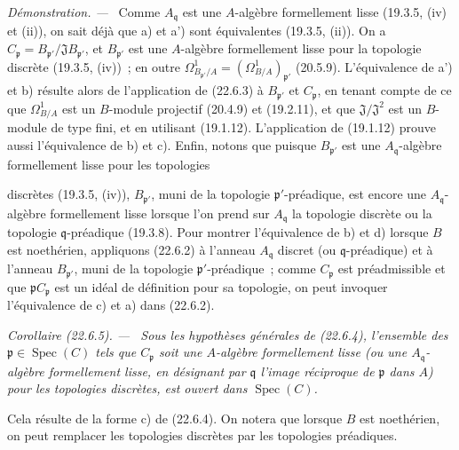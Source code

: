 \documentclass[10pt,oneside]{book}
\makeatletter
\newcommand{\setmanualcurrentlabel}[1]{\def\@currentlabel{#1}}
\newcommand{\oldpage}[2][]{%
  \setcounter{footnote}{0}%
  \marginpar{\scriptsize\textbf{#1}~|~#2}\ignorespaces}
\newenvironment{corollary}[1][]{%
  \setmanualcurrentlabel{#1}\par\medskip\noindent\itshape Corollaire (#1). ---\ }{\par}
\newenvironment{proof}{%
  \par\medskip\noindent\textit{Démonstration. ---\ }}{\par}
\makeatother
\begin{document}
\begin{proof}
Comme $A_{\mathfrak q}$ est une $A$-algèbre formellement lisse (19.3.5, (iv)
et (ii)), on sait déjà que a) et a') sont équivalentes (19.3.5, (ii)). On a
$C_{\mathfrak p}=B_{\mathfrak p'}/\mathfrak J B_{\mathfrak p'}$, et
$B_{\mathfrak p'}$ est une $A$-algèbre formellement lisse pour la topologie
discrète (19.3.5, (iv))~; en outre
$\Omega^1_{B_{\mathfrak p'}/A}=(\Omega^1_{B/A})_{\mathfrak p'}$ (20.5.9).
L'équivalence de a') et b) résulte alors de l'application de (22.6.3) à
$B_{\mathfrak p'}$ et $C_{\mathfrak p}$, en tenant compte de ce que
$\Omega^1_{B/A}$ est un $B$-module projectif (20.4.9) et (19.2.11), et que
$\mathfrak J/\mathfrak J^2$ est un $B$-module de type fini, et en utilisant
(19.1.12). L'application de (19.1.12) prouve aussi l'équivalence de b) et c).
Enfin, notons que puisque $B_{\mathfrak p'}$ est une
$A_{\mathfrak q}$-algèbre formellement lisse pour les topologies

\oldpage[0\textsubscript{IV-1}]{207}

discrètes (19.3.5, (iv)), $B_{\mathfrak p'}$, muni de la topologie
$\mathfrak p'$-préadique, est encore une $A_{\mathfrak q}$-algèbre
formellement lisse lorsque l'on prend sur $A_{\mathfrak q}$ la topologie
discrète ou la topologie $\mathfrak q$-préadique (19.3.8). Pour montrer
l'équivalence de b) et d) lorsque $B$ est noethérien, appliquons (22.6.2) à
l'anneau $A_{\mathfrak q}$ discret (ou $\mathfrak q$-préadique) et à l'anneau
$B_{\mathfrak p'}$, muni de la topologie $\mathfrak p'$-préadique~; comme
$C_{\mathfrak p}$ est préadmissible et que $\mathfrak pC_{\mathfrak p}$ est
un idéal de définition pour sa topologie, on peut invoquer l'équivalence de
c) et a) dans (22.6.2).
\end{proof}

\begin{corollary}[22.6.5]
\label{0.22.6.5-fr}
Sous les hypothèses générales de (22.6.4), l'ensemble des
$\mathfrak p\in\operatorname{Spec}(C)$ tels que $C_{\mathfrak p}$ soit une $A$-algèbre
formellement lisse (ou une $A_{\mathfrak q}$-algèbre formellement lisse, en
désignant par $\mathfrak q$ l'image réciproque de $\mathfrak p$ dans $A$)
pour les topologies discrètes, est ouvert dans $\operatorname{Spec}(C)$.
\end{corollary}

Cela résulte de la forme c) de (22.6.4). On notera que lorsque $B$ est
noethérien, on peut remplacer les topologies discrètes par les topologies
préadiques.
\end{document}
